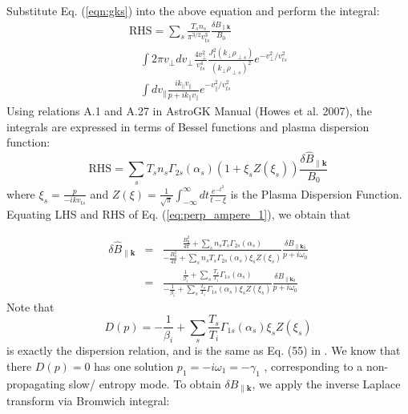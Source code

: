 \documentclass[12pt]{article}
\begin{document}
Substitute Eq. (\ref{eqn:gks}) into the above equation and perform the integral:
\begin{equation}
\begin{split}
\mathrm{RHS} = \sum_s \frac{T_s n_s}{\pi^{3/2} v_{ts}^3} \frac{\delta B_{\parallel \mathbf{k}}}{B_0} \\ 
\quad \int 2\pi v_\perp dv_\perp \frac{4v_\perp^2}{v_{ts}^4} \frac{J_1^2(k_\perp \rho_{\perp s})}{(k_\perp \rho_{\perp s})^2} e^{-v_\perp^2/v_{ts}^2}\\
\quad \int dv_\parallel \frac{ik_\parallel v_\parallel}{p + ik_\parallel v_\parallel}e^{-v_\parallel^2/v_{ts}^2}
\end{split}
\end{equation}
%
Using relations A.1 and A.27 in AstroGK Manual (Howes et al. 2007), the integrals are expressed in terms of Bessel functions and plasma dispersion function:
\begin{equation}
\mathrm{RHS} = \sum_s T_s n_s \Gamma_{2s}(\alpha_s) \left( 1+\xi_s Z(\xi_s)\right)\frac{\delta \hat{B}_{\parallel \mathbf{k}}}{B_0}
\end{equation}
where $\xi_s = \frac{p}{-ikv_{ts}}$ and $Z(\xi) = \frac{1}{\sqrt{\pi}} \int_{-\infty}^\infty dt \frac{e^{-t^2}}{t-\xi}$ is the Plasma Dispersion Function. 
Equating LHS and RHS of Eq. (\ref{eq:perp_ampere_1}), we obtain that

\begin{eqnarray}
\delta \hat{B}_{\parallel \mathbf{k}} &=& \frac{ \frac{B_0^2}{4\pi} + \sum_s n_sT_s\Gamma_{2s}(\alpha_s)}{ -\frac{B_0^2}{4\pi} + \sum_s n_sT_s\Gamma_{2s}(\alpha_s) \xi_s Z(\xi_s)}\frac{ \delta B_{\parallel \mathbf{k}_0}}{p+i\omega_0} \\
&=&\frac{ \frac{1}{\beta_i} + \sum_s \frac{T_s}{T_i}\Gamma_{1s}(\alpha_s)}{ -\frac{1}{\beta_i} + \sum_s \frac{T_s}{T_i}\Gamma_{1s}(\alpha_s) \xi_s Z(\xi_s)}\frac{ \delta B_{\parallel \mathbf{k}_0}}{p+i\omega_0}
\end{eqnarray}
Note that  
%
\begin{equation}
D(p) = -\frac{1}{\beta_i} + \sum_s \frac{T_s}{T_i}\Gamma_{1s}(\alpha_s) \xi_s Z(\xi_s)
\end{equation} 
is exactly the dispersion relation, and is the same as Eq. (55) in \cite{Howes:2006a}. We know that there $D(p)=0$ has one  solution $p_1 = -i\omega_1 = - \gamma_1$ , corresponding to a non-propagating slow/ entropy mode. To obtain $\delta B_{\parallel \mathbf{k}}$, we apply the inverse Laplace transform via Bromwich integral:
\end{document}
